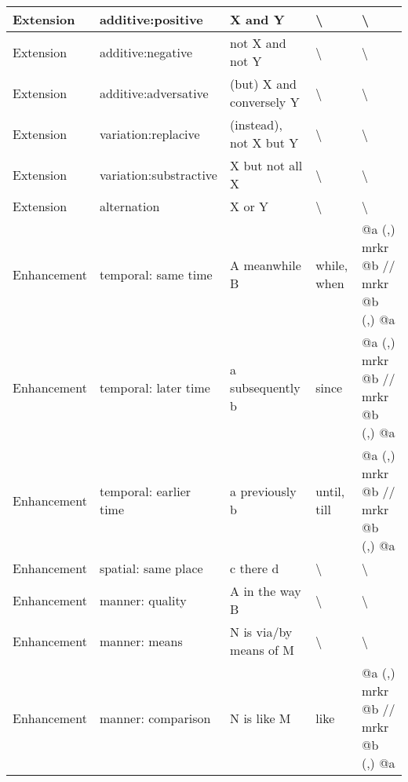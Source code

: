 \begin{landscape}
\begin{longtable}{|l|l|p{3cm}|p{5cm}|p{5cm}|}
			Extension   & additive:positive      & X and Y                              & \textbackslash                         & \textbackslash                             \\ \hline
			Extension   & additive:negative      & not X and not Y                      & \textbackslash                         & \textbackslash                             \\ \hline
			Extension   & additive:adversative   & (but) X and conversely Y             & \textbackslash                         & \textbackslash                             \\ \hline
			Extension   & variation:replacive    & (instead), not X but Y               & \textbackslash                         & \textbackslash                             \\ \hline
			Extension   & variation:substractive & X but not all X                      & \textbackslash                         & \textbackslash                             \\ \hline
			Extension   & alternation            & X or Y                               & \textbackslash                         & \textbackslash                             \\ \hline
			Enhancement & temporal: same time    & A meanwhile B                        & while, when                            & @a (,) mrkr @b // mrkr @b (,) @a           \\ \hline
			Enhancement & temporal: later time   & a subsequently b                     & since                                  & @a (,) mrkr @b // mrkr @b (,) @a           \\ \hline
			Enhancement & temporal: earlier time & a previously b                       & until, till                            & @a (,) mrkr @b // mrkr @b (,) @a           \\ \hline
			Enhancement & spatial: same place    & c there d                            & \textbackslash                         & \textbackslash                             \\ \hline
			Enhancement & manner: quality        & A in the way B                       & \textbackslash                         & \textbackslash                             \\ \hline
			Enhancement & manner: means          & N is via/by means of M               & \textbackslash                         & \textbackslash                             \\ \hline
			Enhancement & manner: comparison     & N is like M                          & like                                   & @a (,) mrkr @b // mrkr @b (,) @a           \\ \hline

\end{longtable}
\end{landscape}
